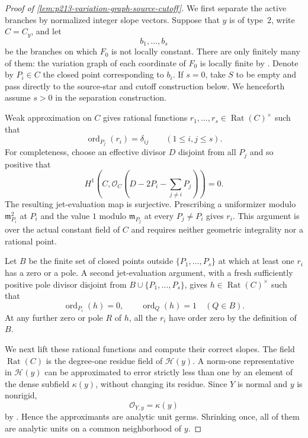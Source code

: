 \begin{proof}[Proof of
\cref{lem:p213-variation-graph-source-cutoff}]
We first separate the active branches by normalized integer slope vectors.
Suppose that $y$ is of type~$2$, write $C=C_y$, and let
\[
                     b_1,\ldots,b_s
\]
be the branches on which $F_0$ is not locally constant.  There are only
finitely many of them: the variation graph of each coordinate of $F_0$ is
locally finite by \cite[\S\S4.5.21.1--4.5.21.2]
{Ducros24CurveStructure}.  Denote by $P_i\in C$ the closed point
corresponding to $b_i$.  If $s=0$, take $S$ to be empty and pass directly
to the source-star and cutoff construction below.  We henceforth assume
$s>0$ in the separation construction.

Weak approximation on $C$ gives rational functions
$r_1,\ldots,r_s\in\operatorname{Rat}(C)^\times$ such that
\begin{equation}
       \operatorname{ord}_{P_j}(r_i)=\delta_{ij}
       \qquad(1\leq i,j\leq s).
\label{eq:p213-variation-first-order-block-revised}
\end{equation}
For completeness, choose an effective divisor $D$ disjoint from all
$P_j$ and so positive that
\[
 H^1\!\left(C,
   \mathcal O_C\!\left(D-2P_i-\sum_{j\ne i}P_j\right)\right)=0.
\]
The resulting jet-evaluation map is surjective.  Prescribing a
uniformizer modulo $\mathfrak m_{P_i}^2$ at $P_i$ and the value $1$
modulo $\mathfrak m_{P_j}$ at every $P_j\ne P_i$ gives $r_i$.
This argument is over the actual constant field of $C$ and requires
neither geometric integrality nor a rational point.

Let $B$ be the finite set of closed points outside
$\{P_1,\ldots,P_s\}$ at which at least one $r_i$ has a zero or a pole.
A second jet-evaluation argument, with a fresh sufficiently positive pole
divisor disjoint from $B\cup\{P_1,\ldots,P_s\}$, gives
$h\in\operatorname{Rat}(C)^\times$ such that
\begin{equation}
 \operatorname{ord}_{P_i}(h)=0,
 \qquad
 \operatorname{ord}_{Q}(h)=1\quad(Q\in B).
\label{eq:p213-variation-collision-killer-revised}
\end{equation}
At any further zero or pole $R$ of $h$, all the $r_i$ have order zero by
the definition of $B$.

We next lift these rational functions and compute their correct slopes.
The field $\operatorname{Rat}(C)$ is the degree-one residue field of
$\mathcal H(y)$.  A norm-one representative in $\mathcal H(y)$ can be
approximated to error strictly less than one by an element of the dense
subfield $\kappa(y)$, without changing its residue.  Since $Y$ is normal
and $y$ is nonrigid,
\begin{equation}
                         \mathcal O_{Y,y}=\kappa(y)
\label{eq:p213-variation-normal-local-field-revised}
\end{equation}
by \cite[\S4.2.18]{Ducros24CurveStructure}.  Hence the approximants are
analytic unit germs.  Shrinking once, all of them are analytic units on a
common neighborhood of $y$.


\end{proof}
